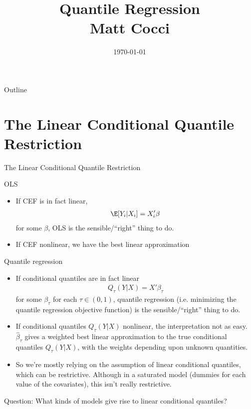 \documentclass[aspectratio=169, handout]{beamer}
\title[]{Quantile Regression \\ Matt Cocci}
\author[]{}
\date{\today}
\begin{document}
\begin{frame}[plain]
\titlepage
\end{frame}


\begin{frame}{Outline}
\tableofcontents[hideallsubsections]
\end{frame}


\section{The Linear Conditional Quantile Restriction}

{\scriptsize
\begin{frame}{The Linear Conditional Quantile Restriction}

OLS
\vspace{-7pt}
\begin{itemize}
  \item If \alert{CEF} is in fact \alert{linear},
  \vspace{-7pt}
    \begin{align*}
      \E[Y_i|X_i] = X_i'\beta
    \end{align*}
    for some $\beta$, OLS is the sensible/``right'' thing to do.
  \item If CEF \alert{nonlinear}, we have the
    \alert{best linear approximation}
\end{itemize}
\vspace{-3pt}
\pause
Quantile regression
\vspace{-7pt}
\begin{itemize}
  \item If \alert{conditional quantiles} are in fact \alert{linear}
    \begin{align*}
      Q_\tau(Y|X) = X'\beta_\tau
    \end{align*}
    for some $\beta_\tau$ for each $\tau\in(0,1)$, quantile regression
    (i.e. minimizing the quantile regression objective function)
    is the sensible/``right'' thing to do.

    \pause
  \item If conditional quantiles $Q_\tau(Y|X)$ \alert{nonlinear}, the
    interpretation not as easy.
    $\hat{\beta}_\tau$ gives a \alert{weighted} best linear
    approximation to the true conditional quantiles $Q_\tau(Y|X)$, with
    the weights depending upon unknown quantities.

  \pause
  \item So we're mostly \alert{relying on the assumption} of linear
    conditional quantiles, which can be restrictive.
    Although in a \alert{saturated} model (dummies for each value of the
    covariates), this isn't really restrictive.
\end{itemize}
\pause
\vspace{-5pt}
\alert{Question}:
What kinds of models give rise to linear conditional quantiles?
\end{frame}
}
\end{document}
